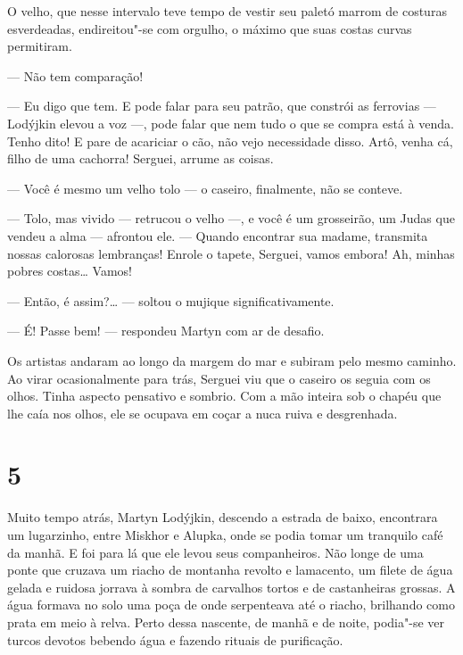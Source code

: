 O velho, que nesse intervalo teve tempo de vestir seu paletó marrom de
costuras esverdeadas, endireitou"-se com orgulho, o máximo que suas
costas curvas permitiram.


--- Não tem comparação!

--- Eu digo que tem. E pode falar para seu patrão, que constrói as
ferrovias --- Lodýjkin elevou a voz ---, pode falar que nem tudo o que
se compra está à venda. Tenho dito! E pare de acariciar o cão, não vejo
necessidade disso. Artô, venha cá, filho de uma cachorra! Serguei,
arrume as coisas.

--- Você é mesmo um velho tolo --- o caseiro, finalmente, não se
conteve.

--- Tolo, mas vivido --- retrucou o velho ---, e você é um grosseirão,
um Judas que vendeu a alma --- afrontou ele. --- Quando encontrar sua
madame, transmita nossas calorosas lembranças! Enrole o tapete, Serguei,
vamos embora! Ah, minhas pobres costas\ldots{} Vamos!

--- Então, é assim?\ldots{} --- soltou o mujique significativamente.

--- É! Passe bem! --- respondeu Martyn com ar de desafio.

Os artistas andaram ao longo da margem do mar e subiram pelo mesmo
caminho. Ao virar ocasionalmente para trás, Serguei viu que o caseiro os
seguia com os olhos. Tinha aspecto pensativo e sombrio. Com a mão
inteira sob o chapéu que lhe caía nos olhos, ele se ocupava em coçar a
nuca ruiva e desgrenhada.

\section{5}

Muito tempo atrás, Martyn Lodýjkin, descendo a estrada de baixo,
encontrara um lugarzinho, entre Miskhor e Alupka, onde se podia tomar um
tranquilo café da manhã. E foi para lá que ele levou seus companheiros.
Não longe de uma ponte que cruzava um riacho de montanha revolto e
lamacento, um filete de água gelada e ruidosa jorrava à sombra de
carvalhos tortos e de castanheiras grossas. A água formava no solo uma
poça de onde serpenteava até o riacho, brilhando como prata em meio à
relva. Perto dessa nascente, de manhã e de noite, podia"-se ver turcos
devotos bebendo água e fazendo rituais de purificação.

